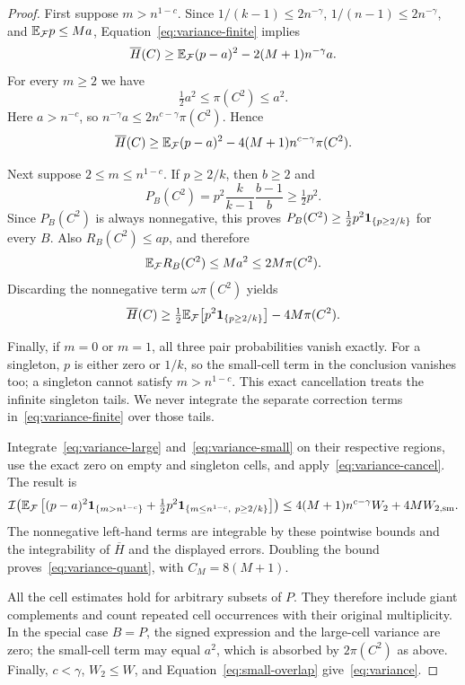 \begin{proof}
First suppose $m>n^{1-c}$.  Since
$1/(k-1)\le2n^{-\gamma}$, $1/(n-1)\le2n^{-\gamma}$, and
$\mathbb E_{\mathcal F}p\le Ma$, Equation~\eqref{eq:variance-finite} implies
\[
 \overline H(C)\ge\mathbb E_{\mathcal F}(p-a)^2
                   -2(M+1)n^{-\gamma}a.
\]
For every $m\ge2$ we have
\begin{equation}\label{eq:variance-pair-comparison}
 \tfrac12a^2\le\pi(C^2)\le a^2.
\end{equation}
Here $a>n^{-c}$, so
$n^{-\gamma}a\le2n^{c-\gamma}\pi(C^2)$.  Hence
\begin{equation}\label{eq:variance-large}
 \overline H(C)\ge\mathbb E_{\mathcal F}(p-a)^2
       -4(M+1)n^{c-\gamma}\pi(C^2).
\end{equation}

Next suppose $2\le m\le n^{1-c}$.  If $p\ge2/k$, then $b\ge2$ and
\[
 P_B(C^2)=p^2\frac{k}{k-1}\frac{b-1}{b}\ge\tfrac12p^2.
\]
Since $P_B(C^2)$ is always nonnegative, this proves
$P_B(C^2)\ge\tfrac12p^2\mathbf 1_{\{p\ge2/k\}}$ for every $B$.
Also $R_B(C^2)\le ap$, and therefore
\[
 \mathbb E_{\mathcal F}R_B(C^2)\le Ma^2\le2M\pi(C^2).
\]
Discarding the nonnegative term $\omega\pi(C^2)$ yields
\begin{equation}\label{eq:variance-small}
 \overline H(C)\ge\tfrac12\mathbb E_{\mathcal F}
                \bigl[p^2\mathbf 1_{\{p\ge2/k\}}\bigr]-4M\pi(C^2).
\end{equation}

Finally, if $m=0$ or $m=1$, all three pair probabilities vanish exactly.
For a singleton, $p$ is either zero or $1/k$, so the small-cell term in
the conclusion vanishes too; a singleton cannot satisfy
$m>n^{1-c}$.  This exact cancellation treats the infinite singleton
tails.  We never integrate the separate correction terms
in~\eqref{eq:variance-finite} over those tails.

Integrate~\eqref{eq:variance-large} and~\eqref{eq:variance-small} on
their respective regions, use the exact zero on empty and singleton
cells, and apply~\eqref{eq:variance-cancel}.  The result is
\begin{align*}
 \mathcal I\!\left(\mathbb E_{\mathcal F}\left[
 (p-a)^2\mathbf 1_{\{m>n^{1-c}\}}
 +\tfrac12p^2\mathbf 1_{\{m\le n^{1-c},\ p\ge2/k\}}
 \right]\right)
 \le 4(M+1)n^{c-\gamma}W_2+4M W_{2,\mathrm{sm}}.
\end{align*}
The nonnegative left-hand terms are integrable by these pointwise
bounds and the integrability of $\overline H$ and the displayed errors.
Doubling the bound proves~\eqref{eq:variance-quant}, with
$C_M=8(M+1)$.

All the cell estimates hold for arbitrary subsets of $P$.
They therefore include giant complements and count repeated cell
occurrences with their original multiplicity.  In the special case
$B=P$, the signed expression and the large-cell variance are zero;
the small-cell term may equal $a^2$, which is absorbed by
$2\pi(C^2)$ as above.  Finally, $c<\gamma$, $W_2\le W$, and
Equation~\eqref{eq:small-overlap} give~\eqref{eq:variance}.
\end{proof}

